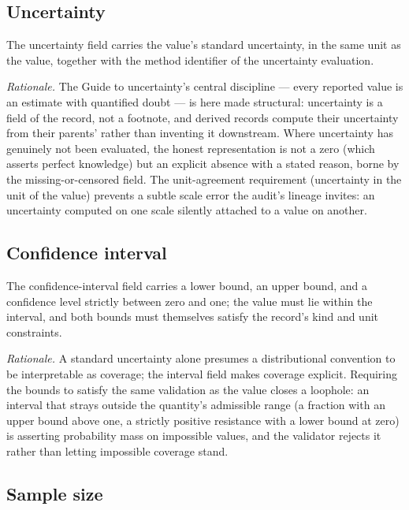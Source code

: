 \subsection{Uncertainty}\label{ch03:field:uncertainty}

The uncertainty field carries the value's standard uncertainty, in the same unit as the value, together with the method identifier of the uncertainty evaluation.

\emph{Rationale.} The Guide to uncertainty's central discipline --- every reported value is an estimate with quantified doubt \cite{gum} --- is here made structural: uncertainty is a field of the record, not a footnote, and derived records compute their uncertainty from their parents' rather than inventing it downstream. Where uncertainty has genuinely not been evaluated, the honest representation is not a zero (which asserts perfect knowledge) but an explicit absence with a stated reason, borne by the missing-or-censored field. The unit-agreement requirement (uncertainty in the unit of the value) prevents a subtle scale error the audit's lineage invites: an uncertainty computed on one scale silently attached to a value on another.

\subsection{Confidence interval}\label{ch03:field:ci}

The confidence-interval field carries a lower bound, an upper bound, and a confidence level strictly between zero and one; the value must lie within the interval, and both bounds must themselves satisfy the record's kind and unit constraints.

\emph{Rationale.} A standard uncertainty alone presumes a distributional convention to be interpretable as coverage; the interval field makes coverage explicit. Requiring the bounds to satisfy the same validation as the value closes a loophole: an interval that strays outside the quantity's admissible range (a fraction with an upper bound above one, a strictly positive resistance with a lower bound at zero) is asserting probability mass on impossible values, and the validator rejects it rather than letting impossible coverage stand.

\subsection{Sample size}\label{ch03:field:n}


